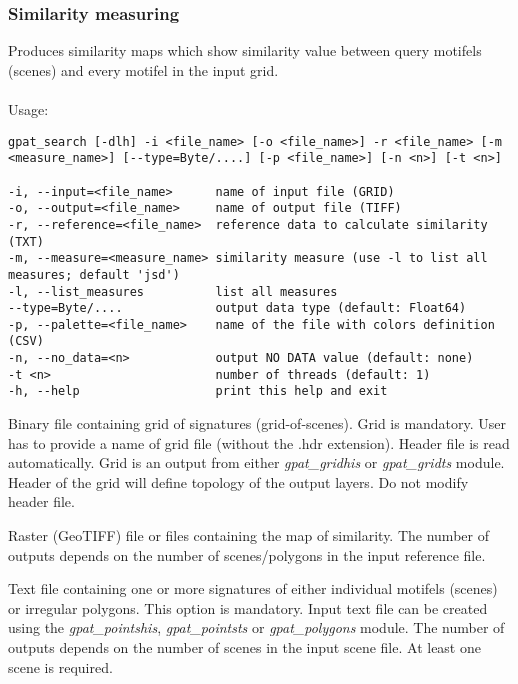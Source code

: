 \subsubsection{Similarity measuring}

Produces similarity maps which show similarity value between query motifels (scenes) and every motifel in the input grid.
\\\\
Usage:

\begin{minipage}{\linewidth}
\begin{lstlisting}
gpat_search [-dlh] -i <file_name> [-o <file_name>] -r <file_name> [-m <measure_name>] [--type=Byte/....] [-p <file_name>] [-n <n>] [-t <n>]

-i, --input=<file_name>      name of input file (GRID)
-o, --output=<file_name>     name of output file (TIFF)
-r, --reference=<file_name>  reference data to calculate similarity (TXT)
-m, --measure=<measure_name> similarity measure (use -l to list all measures; default 'jsd')
-l, --list_measures          list all measures
--type=Byte/....             output data type (default: Float64)
-p, --palette=<file_name>    name of the file with colors definition (CSV)
-n, --no_data=<n>            output NO DATA value (default: none)
-t <n>                       number of threads (default: 1)
-h, --help                   print this help and exit
\end{lstlisting}
\end{minipage}


Binary file containing grid of signatures (grid-of-scenes). 
Grid is mandatory. 
User has to provide a name of grid file (without the .hdr extension). 
Header file is read automatically. 
Grid is an output from either {\it gpat\_gridhis} or {\it gpat\_gridts} module. 
Header of the grid will define topology of the output layers. 
Do not modify header file.


Raster (GeoTIFF) file or files containing the map of similarity. 
The number of outputs depends on the number of scenes/polygons in the input reference file. 


Text file containing one or more signatures of either individual motifels (scenes) or irregular polygons. 
This option is mandatory. 
Input text file can be created using the {\it gpat\_pointshis}, {\it gpat\_pointsts} or {\it gpat\_polygons} module. 
The number of outputs depends on the number of scenes in the input scene file. 
At least one scene is required. 

